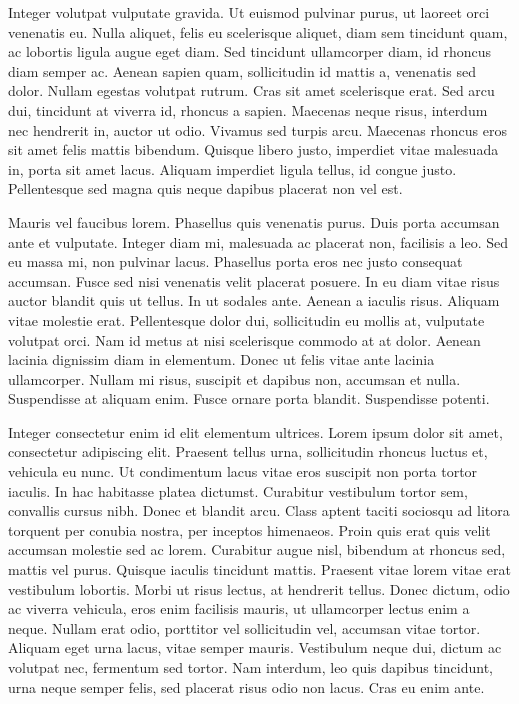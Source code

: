 Integer volutpat vulputate gravida.
Ut euismod pulvinar purus, ut laoreet orci venenatis eu.
Nulla aliquet, felis eu scelerisque aliquet, diam sem tincidunt quam, ac lobortis ligula augue eget diam.
Sed tincidunt ullamcorper diam, id rhoncus diam semper ac.
Aenean sapien quam, sollicitudin id mattis a, venenatis sed dolor.
Nullam egestas volutpat rutrum.
Cras sit amet scelerisque erat.
Sed arcu dui, tincidunt at viverra id, rhoncus a sapien.
Maecenas neque risus, interdum nec hendrerit in, auctor ut odio.
Vivamus sed turpis arcu.
Maecenas rhoncus eros sit amet felis mattis bibendum.
Quisque libero justo, imperdiet vitae malesuada in, porta sit amet lacus.
Aliquam imperdiet ligula tellus, id congue justo.
Pellentesque sed magna quis neque dapibus placerat non vel est.

Mauris vel faucibus lorem.
Phasellus quis venenatis purus.
Duis porta accumsan ante et vulputate.
Integer diam mi, malesuada ac placerat non, facilisis a leo.
Sed eu massa mi, non pulvinar lacus.
Phasellus porta eros nec justo consequat accumsan.
Fusce sed nisi venenatis velit placerat posuere.
In eu diam vitae risus auctor blandit quis ut tellus.
In ut sodales ante.
Aenean a iaculis risus.
Aliquam vitae molestie erat.
Pellentesque dolor dui, sollicitudin eu mollis at, vulputate volutpat orci.
Nam id metus at nisi scelerisque commodo at at dolor.
Aenean lacinia dignissim diam in elementum.
Donec ut felis vitae ante lacinia ullamcorper.
Nullam mi risus, suscipit et dapibus non, accumsan et nulla.
Suspendisse at aliquam enim.
Fusce ornare porta blandit.
Suspendisse potenti.

Integer consectetur enim id elit elementum ultrices.
Lorem ipsum dolor sit amet, consectetur adipiscing elit.
Praesent tellus urna, sollicitudin rhoncus luctus et, vehicula eu nunc.
Ut condimentum lacus vitae eros suscipit non porta tortor iaculis.
In hac habitasse platea dictumst.
Curabitur vestibulum tortor sem, convallis cursus nibh.
Donec et blandit arcu.
Class aptent taciti sociosqu ad litora torquent per conubia nostra, per inceptos himenaeos.
Proin quis erat quis velit accumsan molestie sed ac lorem.
Curabitur augue nisl, bibendum at rhoncus sed, mattis vel purus.
Quisque iaculis tincidunt mattis.
Praesent vitae lorem vitae erat vestibulum lobortis.
Morbi ut risus lectus, at hendrerit tellus.
Donec dictum, odio ac viverra vehicula, eros enim facilisis mauris, ut ullamcorper lectus enim a neque.
Nullam erat odio, porttitor vel sollicitudin vel, accumsan vitae tortor.
Aliquam eget urna lacus, vitae semper mauris.
Vestibulum neque dui, dictum ac volutpat nec, fermentum sed tortor.
Nam interdum, leo quis dapibus tincidunt, urna neque semper felis, sed placerat risus odio non lacus.
Cras eu enim ante.

